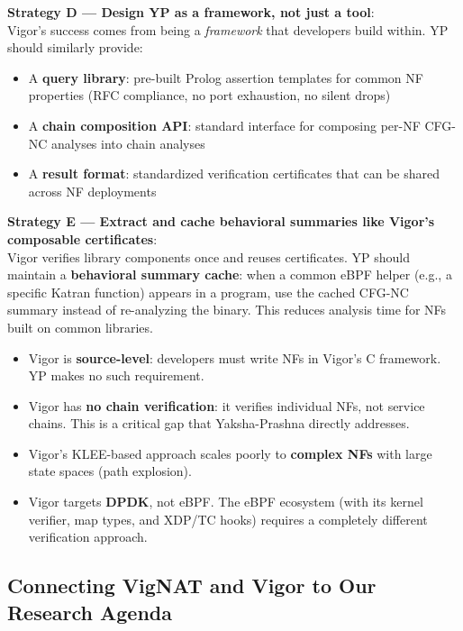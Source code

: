 \begin{strategybox}
\textbf{Strategy D --- Design YP as a framework, not just a tool}:\\
Vigor's success comes from being a \emph{framework} that developers build within. YP should similarly provide:
\begin{itemize}
  \item A \textbf{query library}: pre-built Prolog assertion templates for common NF properties (RFC compliance, no port exhaustion, no silent drops)
  \item A \textbf{chain composition API}: standard interface for composing per-NF CFG-NC analyses into chain analyses
  \item A \textbf{result format}: standardized verification certificates that can be shared across NF deployments
\end{itemize}

\textbf{Strategy E --- Extract and cache behavioral summaries like Vigor's composable certificates}:\\
Vigor verifies library components once and reuses certificates. YP should maintain a \textbf{behavioral summary cache}: when a common eBPF helper (e.g., a specific Katran function) appears in a program, use the cached CFG-NC summary instead of re-analyzing the binary. This reduces analysis time for NFs built on common libraries.
\end{strategybox}

\begin{limitbox}
\begin{itemize}
  \item Vigor is \textbf{source-level}: developers must write NFs in Vigor's C framework. YP makes no such requirement.
  \item Vigor has \textbf{no chain verification}: it verifies individual NFs, not service chains. This is a critical gap that Yaksha-Prashna directly addresses.
  \item Vigor's KLEE-based approach scales poorly to \textbf{complex NFs} with large state spaces (path explosion).
  \item Vigor targets \textbf{DPDK}, not eBPF. The eBPF ecosystem (with its kernel verifier, map types, and XDP/TC hooks) requires a completely different verification approach.
\end{itemize}
\end{limitbox}

\subsection{Connecting VigNAT and Vigor to Our Research Agenda}

